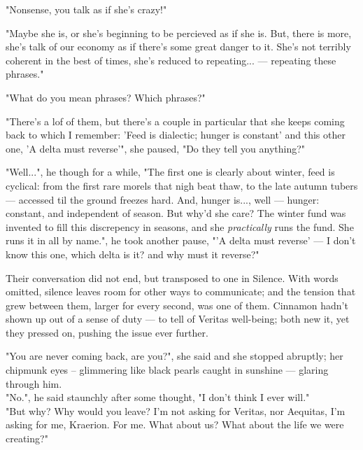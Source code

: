 
"Nonsense, you talk as if she's crazy!"

"Maybe she is, or she's beginning to be percieved as if she is. But, there is more, she's talk of our economy as if there's some great danger to it. She's not terribly coherent in the best of times, she's reduced to repeating... — repeating these phrases."

"What do you mean phrases? Which phrases?"

"There's a lof of them, but there's a couple in particular that she keeps coming back to which I remember: 'Feed is dialectic; hunger is constant' and this other one, 'A delta must reverse'", she paused, "Do they tell you anything?"

"Well...", he though for a while, "The first one is clearly about winter, feed is cyclical: from the first rare morels that nigh beat thaw, to the late autumn tubers — accessed til the ground freezes hard. And, hunger is..., well — hunger: constant, and independent of season. 
But why'd she care? The winter fund was invented to fill this discrepency in seasons, and she \textit{practically} runs the fund. She runs it in all by name.", he took another pause, "'A delta must reverse' — I don't know this one, which delta is it? and why must it reverse?"

Their conversation did not end, but transposed to one in Silence. With words omitted, silence leaves room for other ways to communicate; and the tension that grew between them, larger for every second, was one of them. Cinnamon hadn't shown up out of a sense of duty — to tell of Veritas well-being; both new it, yet they pressed on, pushing the issue ever further.

"You are never coming back, are you?", she said and she stopped abruptly; her chipmunk eyes – glimmering like black pearls caught in sunshine — glaring through him. \\

"No.", he said staunchly after some thought, "I don't think I ever will."\\

"But why? Why would you leave? I'm not asking for Veritas, nor Aequitas, I'm asking for me, Kraerion. For me. What about us? What about the life we were creating?"

